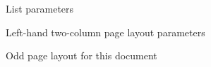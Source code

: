 \documentclass{ctexart}
\begin{document}
\begin{figure}
\listdiagram
\caption{List parameters} \label{fig:lstp}
\end{figure}
\newpage
\begin{figure}
	\oddpagelayoutfalse
	\twocolumnlayouttrue
	\pagediagram
	\caption{Left-hand two-column page layout parameters} \label{fig:pplt}
\end{figure}
\newpage
\begin{figure}
	\currentpage
	\oddpagelayouttrue
	\pagedesign
	\caption{Odd page layout for this document} \label{fig:ptrs}
\end{figure}
\newpage
\end{document}
